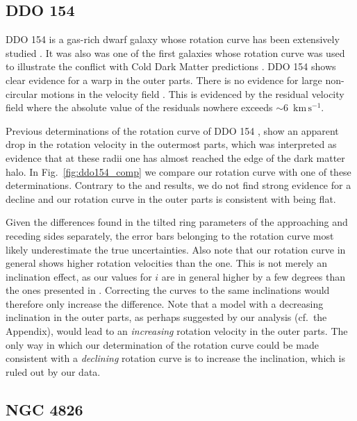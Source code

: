 \documentclass[usenatbib,usegraphicx,apjfonts,floatfix]{emulateapj}
\newcommand{\kms}{\ensuremath{\,\mbox{km}\,\mbox{s}^{-1}}}
\begin{document}
\subsection{DDO 154}

DDO 154 is a gas-rich dwarf galaxy whose rotation curve has been
extensively studied \citep[see][]{car_freeman, car_purton}. It was
also was one of the first galaxies whose rotation curve was used to
illustrate the conflict with Cold Dark Matter predictions
\citep{moore94}. DDO 154 shows clear evidence for a warp in the outer
parts. There is no evidence for large non-circular motions in the
velocity field \citep{clemens2007}.
This is evidenced by the residual
velocity field where the absolute value of the residuals nowhere
exceeds $\sim 6$ \kms.

Previous determinations of the rotation curve of DDO 154 \citep[see
e.g.,][]{car_freeman, car_purton}, show an apparent drop in the
rotation velocity in the outermost parts, which was interpreted as
evidence that at these radii one has almost reached the edge of the
dark matter halo.  In Fig.\ \ref{fig:ddo154_comp} we compare our
rotation curve with one of these determinations. Contrary to the
\citet{car_purton} and \citet{car_freeman} results, we do not find
strong evidence for a decline and our rotation curve in the outer
parts is consistent with being flat.

Given the differences found in the tilted ring parameters of the
approaching and receding sides separately, the error bars belonging to
the \citet{car_purton} rotation curve most likely underestimate the
true uncertainties. Also note that our rotation curve in general shows
higher rotation velocities than the \citet{car_purton} one. This is
not merely an inclination effect, as our values for $i$ are in general
higher by a few degrees than the ones presented in
\citet{car_purton}. Correcting the curves to the same inclinations
would therefore only increase the difference.  Note that a model with
a decreasing inclination in the outer parts, as perhaps suggested by
our analysis (cf.\ the Appendix), would lead to an \emph{increasing}
rotation velocity in the outer parts. The only way in which our
determination of the rotation curve could be made consistent with a
\emph{declining} rotation curve is to increase the inclination, which
is ruled out by our data.

\subsection{NGC 4826}
\end{document}
